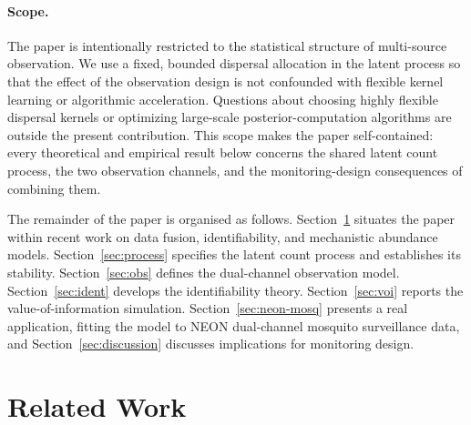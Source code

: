 \documentclass[preprint,12pt]{elsarticle}
\theoremstyle{definition}
\begin{document}
\paragraph{Scope.}
The paper is intentionally restricted to the statistical structure of
multi-source observation. We use a fixed, bounded dispersal allocation in the
latent process so that the effect of the observation design is not confounded
with flexible kernel learning or algorithmic acceleration. Questions about
choosing highly flexible dispersal kernels or optimizing large-scale
posterior-computation algorithms are outside the present contribution. This
scope makes the paper self-contained: every theoretical and empirical result
below concerns the shared latent count process, the two observation channels,
and the monitoring-design consequences of combining them.

The remainder of the paper is organised as follows.
Section~\ref{sec:related} situates the paper within recent work on data
fusion, identifiability, and mechanistic abundance models.
Section~\ref{sec:process} specifies the latent count process and
establishes its stability. Section~\ref{sec:obs} defines the dual-channel
observation model. Section~\ref{sec:ident} develops the identifiability
theory. Section~\ref{sec:voi} reports the value-of-information simulation.
Section~\ref{sec:neon-mosq} presents a real application, fitting the model to
NEON dual-channel mosquito surveillance data, and
Section~\ref{sec:discussion} discusses implications for monitoring
design.

\section{Related Work}
\label{sec:related}
\end{document}
